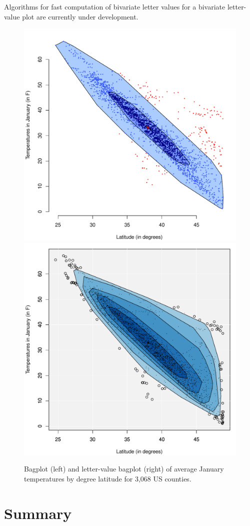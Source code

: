 \documentclass[12pt,oneside]{article}
\begin{document}
Algorithms for fast computation of bivariate letter values for a bivariate letter-value plot are currently under development.

\begin{figure}[hbtp]
  \centering
  \includegraphics[width=0.5\linewidth]{images/counties-bag}%
  \includegraphics[width=0.5\linewidth]{images/counties-lvbag}

  \caption{Bagplot (left) and letter-value bagplot (right) of average January
  temperatures by degree latitude for 3,068 US counties. }

  \label{counties-bag} 

\end{figure}

\section{Summary}
\label{sec:summary}
\end{document}
